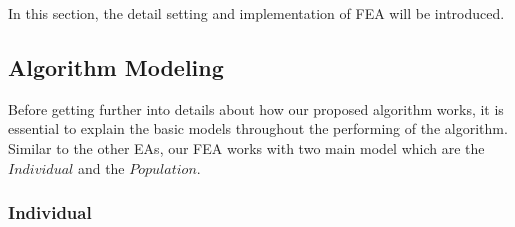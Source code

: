 \documentclass[final]{elsarticle}
\begin{document}
In this section, the detail setting and implementation of FEA will be introduced.

\subsection{Algorithm Modeling}

Before getting further into details about how our proposed algorithm works, it is essential to explain the basic models throughout the performing of the algorithm. Similar to the other EAs, our FEA works with two main model which are the $ Individual $ and the $ Population $.

\subsubsection{Individual}
\end{document}
